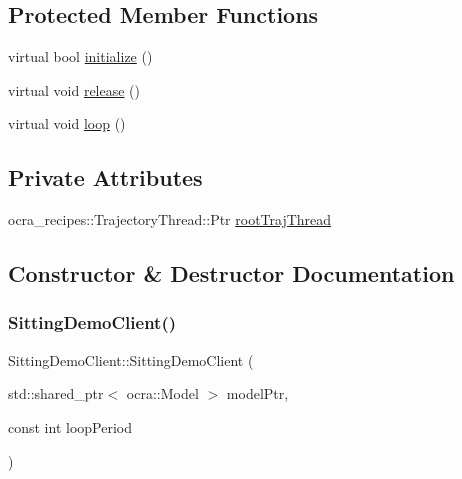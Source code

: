 \subsection*{Protected Member Functions}
\begin{DoxyCompactItemize}
\item 
virtual bool \hyperlink{classSittingDemoClient_aff04405d690f2ae8abbd05ea4b55b64d}{initialize} ()
\item 
virtual void \hyperlink{classSittingDemoClient_a18d30d70a9b17e8f64f87f5cb01b746e}{release} ()
\item 
virtual void \hyperlink{classSittingDemoClient_ad08cf3328c8a4f22a1677b5ad67de645}{loop} ()
\end{DoxyCompactItemize}
\subsection*{Private Attributes}
\begin{DoxyCompactItemize}
\item 
ocra\+\_\+recipes\+::\+Trajectory\+Thread\+::\+Ptr \hyperlink{classSittingDemoClient_a1d5616269e9a673022542bb86f380bfd}{root\+Traj\+Thread}
\end{DoxyCompactItemize}


\subsection{Constructor \& Destructor Documentation}
\hypertarget{classSittingDemoClient_aedcb6c4ad7b4fa19f1b188e700c0a079}{}\label{classSittingDemoClient_aedcb6c4ad7b4fa19f1b188e700c0a079} 
\subsubsection{\texorpdfstring{Sitting\+Demo\+Client()}{SittingDemoClient()}}
{\footnotesize\ttfamily Sitting\+Demo\+Client\+::\+Sitting\+Demo\+Client (\begin{DoxyParamCaption}\item[{std\+::shared\+\_\+ptr$<$ ocra\+::\+Model $>$}]{model\+Ptr,  }\item[{const int}]{loop\+Period }\end{DoxyParamCaption})}

\hypertarget{classSittingDemoClient_a0fb7ded5e44b2b60d7f89c22386154b7}{}\label{classSittingDemoClient_a0fb7ded5e44b2b60d7f89c22386154b7} 
